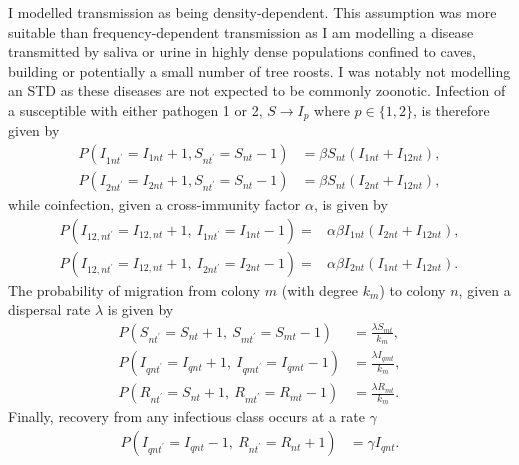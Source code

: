 I modelled transmission as being density-dependent.
This assumption was more suitable than frequency-dependent transmission as I am modelling a disease transmitted by saliva or urine in highly dense populations confined to caves, building or potentially a small number of tree roosts.
I was notably not modelling an STD as these diseases are not expected to be commonly zoonotic.
Infection of a susceptible with either pathogen 1 or 2, $S \rightarrow I_p$ where $p\in \{1,2\}$, is therefore given by
\begin{align}
  P\left( I_{1nt^\prime} = I_{1nt}+1, S_{nt^\prime} = S_{nt}-1 \right) &= \beta S_{nt}\left(I_{1nt} + I_{12nt}\right),\\
  P\left( I_{2nt^\prime} = I_{2nt}+1, S_{nt^\prime} = S_{nt}-1 \right) &= \beta S_{nt}\left(I_{2nt} + I_{12nt}\right),
\end{align}
while coinfection, given a cross-immunity factor $\alpha$, is given by
\begin{align}
  P\left( I_{12,nt^\prime} = I_{12,nt}+1,\: I_{1nt^\prime} = I_{1nt}-1\right) = &\alpha\beta I_{1nt}\left(I_{2nt} + I_{12nt}\right),\\
  P\left( I_{12,nt^\prime} = I_{12,nt}+1,\: I_{2nt^\prime} = I_{2nt}-1\right) = &\alpha\beta I_{2nt}\left(I_{1nt} + I_{12nt}\right).
\end{align}
The probability of migration from colony $m$ (with degree $k_m$) to colony $n$, given a dispersal rate $\lambda$ is given by
\begin{align}
  P\left(S_{nt^\prime}=S_{nt}+1,\: S_{mt^\prime} = S_{mt}-1\right) &= \frac{\lambda S_{mt}}{k_m},\\
  P\left(I_{qnt^\prime}=I_{qnt}+1,\: I_{qmt^\prime} = I_{qmt}-1\right) &= \frac{\lambda I_{qmt}}{k_m},\\
  P\left(R_{nt^\prime}=S_{nt}+1,\: R_{mt^\prime} = R_{mt}-1\right) &= \frac{\lambda R_{mt}}{k_m}.
\end{align}
Finally, recovery from any infectious class occurs at a rate $\gamma$
\begin{align}
  P\left( I_{qnt^\prime} = I_{qnt}-1,\: R_{nt^\prime} = R_{nt}+1 \right) &= \gamma I_{qnt}.
\end{align}


